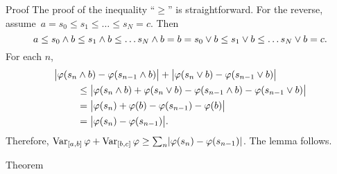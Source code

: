 \documentclass[main.tex]{subfiles}
\begin{document}
\begin{psec*}{Proof}
The proof of the inequality ``$\geq$'' is straightforward.
For the reverse,
assume~$a=s_0\leq s_1 \leq \ldots \leq s_N = c$.
Then
\begin{equation*}
a \leq s_0\wedge b \leq s_1 \wedge b \leq \ldots s_N\wedge b
  = b = s_0 \vee b \leq s_1 \vee b \leq \ldots s_N\vee b = c
\text{.}
\end{equation*}
For each $n$,
\begin{align*}
 \bigl| \varphi(s_n & \wedge b) -\varphi(s_{n-1}\wedge b) \bigr|
       + \bigl| \varphi(s_n \vee b) - \varphi(s_{n-1}\vee b) \bigr|  \\
 & \leq \bigl| \varphi(s_n\wedge b)
       + \varphi(s_n \vee b) 
       -\varphi(s_{n-1}\wedge b) 
       - \varphi(s_{n-1}\vee b) \bigr| \\
 & = \bigl|\varphi(s_n) + \varphi(b) - \varphi(s_{n-1}) -\varphi(b) \bigr| \\
 & = \bigl|\varphi(s_n) - \varphi(s_{n-1})\bigr|
\text{.}
\end{align*}
Therefore,
$\mathop{\mathrm{Var}}_{[a,b]}\varphi + \mathop{\mathrm{Var}}_{[b,c]}\varphi \geq
\smash{\sum_n}|\varphi(s_n)-\varphi(s_{n-1})|$.
The lemma follows. \xqed
\end{psec*}
%
%
\begin{psec}{Theorem}
\label{1.10}
\end{psec}
\end{document}
